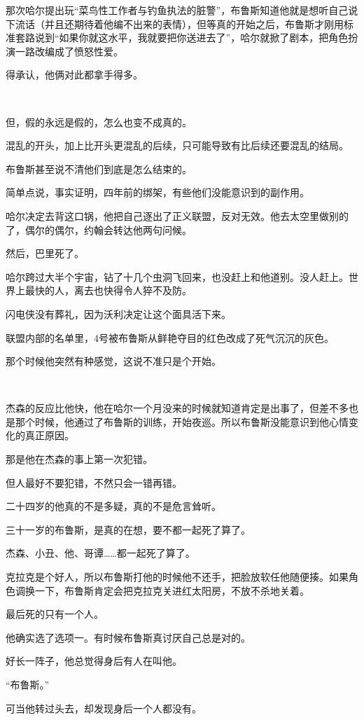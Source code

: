 \documentclass[../main]{subfiles}
\begin{document}
那次哈尔提出玩“菜鸟性工作者与钓鱼执法的脏警”，布鲁斯知道他就是想听自己说下流话（并且还期待着他编不出来的表情），但等真的开始之后，布鲁斯才刚用标准套路说到“如果你就这水平，我就要把你送进去了”，哈尔就掀了剧本，把角色扮演一路改编成了愤怒性爱。

得承认，他俩对此都拿手得多。

~\

但，假的永远是假的，怎么也变不成真的。

混乱的开头，加上比开头更混乱的后续，只可能导致有比后续还要混乱的结局。

布鲁斯甚至说不清他们到底是怎么结束的。

简单点说，事实证明，四年前的绑架，有些他们没能意识到的副作用。

哈尔决定去背这口锅，他把自己逐出了正义联盟，反对无效。他去太空里做别的了，偶尔的偶尔，约翰会转达他两句问候。

然后，巴里死了。

哈尔跨过大半个宇宙，钻了十几个虫洞飞回来，也没赶上和他道别。没人赶上。世界上最快的人，离去也快得令人猝不及防。

闪电侠没有葬礼，因为沃利决定让这个面具活下来。

联盟内部的名单里，4号被布鲁斯从鲜艳夺目的红色改成了死气沉沉的灰色。

那个时候他突然有种感觉，这说不准只是个开始。

~\

杰森的反应比他快，他在哈尔一个月没来的时候就知道肯定是出事了，但差不多也是那个时候，他通过了布鲁斯的训练，开始夜巡。所以布鲁斯没能意识到他心情变化的真正原因。

那是他在杰森的事上第一次犯错。

但人最好不要犯错，不然只会一错再错。

二十四岁的他真的不是多疑，真的不是危言耸听。

三十一岁的布鲁斯，是真的在想，要不都一起死了算了。

杰森、小丑、他、哥谭……都一起死了算了。

克拉克是个好人，所以布鲁斯打他的时候他不还手，把脸放软任他随便揍。如果角色调换一下，布鲁斯肯定会把克拉克关进红太阳房，不放不杀地关着。

最后死的只有一个人。

他确实选了选项一。有时候布鲁斯真讨厌自己总是对的。

好长一阵子，他总觉得身后有人在叫他。

“布鲁斯。”

可当他转过头去，却发现身后一个人都没有。
\end{document}
